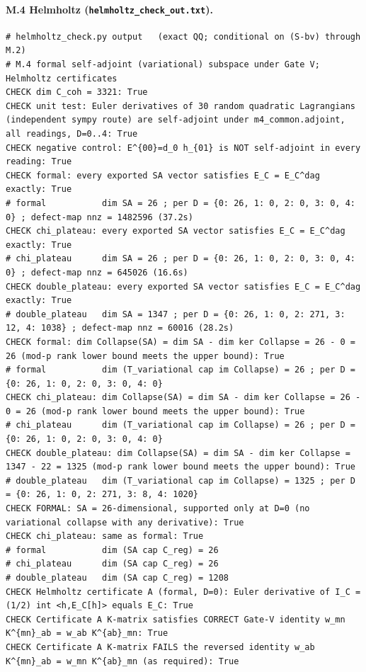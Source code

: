 \documentclass{article}
\theoremstyle{remark}
\begin{document}
\paragraph{M.4 Helmholtz (\texttt{helmholtz\_check\_out.txt}).}
\begin{lstlisting}
# helmholtz_check.py output   (exact QQ; conditional on (S-bv) through M.2)
# M.4 formal self-adjoint (variational) subspace under Gate V; Helmholtz certificates
CHECK dim C_coh = 3321: True
CHECK unit test: Euler derivatives of 30 random quadratic Lagrangians (independent sympy route) are self-adjoint under m4_common.adjoint, all readings, D=0..4: True
CHECK negative control: E^{00}=d_0 h_{01} is NOT self-adjoint in every reading: True
CHECK formal: every exported SA vector satisfies E_C = E_C^dag exactly: True
# formal           dim SA = 26 ; per D = {0: 26, 1: 0, 2: 0, 3: 0, 4: 0} ; defect-map nnz = 1482596 (37.2s)
CHECK chi_plateau: every exported SA vector satisfies E_C = E_C^dag exactly: True
# chi_plateau      dim SA = 26 ; per D = {0: 26, 1: 0, 2: 0, 3: 0, 4: 0} ; defect-map nnz = 645026 (16.6s)
CHECK double_plateau: every exported SA vector satisfies E_C = E_C^dag exactly: True
# double_plateau   dim SA = 1347 ; per D = {0: 26, 1: 0, 2: 271, 3: 12, 4: 1038} ; defect-map nnz = 60016 (28.2s)
CHECK formal: dim Collapse(SA) = dim SA - dim ker Collapse = 26 - 0 = 26 (mod-p rank lower bound meets the upper bound): True
# formal           dim (T_variational cap im Collapse) = 26 ; per D = {0: 26, 1: 0, 2: 0, 3: 0, 4: 0}
CHECK chi_plateau: dim Collapse(SA) = dim SA - dim ker Collapse = 26 - 0 = 26 (mod-p rank lower bound meets the upper bound): True
# chi_plateau      dim (T_variational cap im Collapse) = 26 ; per D = {0: 26, 1: 0, 2: 0, 3: 0, 4: 0}
CHECK double_plateau: dim Collapse(SA) = dim SA - dim ker Collapse = 1347 - 22 = 1325 (mod-p rank lower bound meets the upper bound): True
# double_plateau   dim (T_variational cap im Collapse) = 1325 ; per D = {0: 26, 1: 0, 2: 271, 3: 8, 4: 1020}
CHECK FORMAL: SA = 26-dimensional, supported only at D=0 (no variational collapse with any derivative): True
CHECK chi_plateau: same as formal: True
# formal           dim (SA cap C_reg) = 26
# chi_plateau      dim (SA cap C_reg) = 26
# double_plateau   dim (SA cap C_reg) = 1208
CHECK Helmholtz certificate A (formal, D=0): Euler derivative of I_C = (1/2) int <h,E_C[h]> equals E_C: True
CHECK Certificate A K-matrix satisfies CORRECT Gate-V identity w_mn K^{mn}_ab = w_ab K^{ab}_mn: True
CHECK Certificate A K-matrix FAILS the reversed identity w_ab K^{mn}_ab = w_mn K^{ab}_mn (as required): True

\end{lstlisting}
\end{document}
